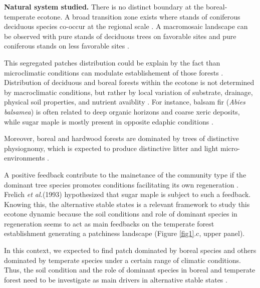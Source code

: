 \textbf{Natural system studied.} There is no distinct boundary at the boreal-
temperate ecotone. A broad transition zone exists where stands of coniferous
deciduous species co-occur at the regional scale \cite{Goldblum2010}. A
macromosaic landscape can be observed with pure stands of deciduous trees on
favorable sites and pure coniferous stands on less favorable sites
\cite{Goldblum2010}. 


This segregated patches distribution could be explain by
the fact than microclimatic conditions can modulate establishement of those
forests \cite{DeFrenne2013}. Distribution of deciduous and boreal forests
within the ecotone is not determined by macroclimatic conditions, but rather
by local variation of substrate, drainage, physical soil properties, and
nutrient avaiblity \cite{Goldblum2010,Society2014}.  For instance, balsam fir
(\textit{Abies balsamea}) is often related to deep organic horizons and
coarse xeric deposits, while sugar maple is mostly present in opposite edaphic
conditions \cite{Messaoud2007,Kellman2004,Barras1998}.


Moreover, boreal and hardwood forests are dominated by trees of distinctive
physiognomy, which is expected to produce distinctive litter and light
micro-environments \cite{Barras1998}.

A positive feedback contribute to the mainetance of the community type if the
dominant tree species promotes conditions facilitating its own regeneration
\cite{Barras1998}. Frelich \textit{et al.}(1993) \cite{Society2014}
hypothesized that sugar maple is subject to such a feedback.  Knowing this,
the alternative stable states is a relevant framework to study this ecotone
dynamic because the soil conditions and role of dominant species in
regeneration seems to act as main feedbacks on the temperate forest
establishment generating a patchiness landscape (Figure \ref{fig1}.c, upper
panel).


In this context, we expected to find patch dominated by boreal species and
others dominated by temperate species under a certain range of climatic
conditions. Thus, the soil condition and the role of dominant species in
boreal and temperate forest need to be investigate as main drivers in
alternative stable states
\cite{Kellman2004,Moore2008,DeFrenne2013,Barras1998}.

